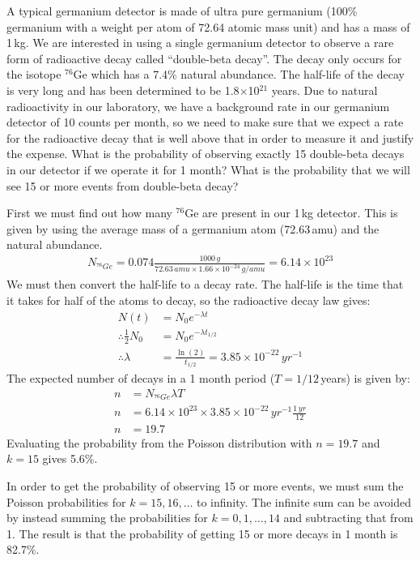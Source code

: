 \begin{example}{}{A typical germanium detector is made of ultra pure germanium (100\% germanium with a weight per atom of 72.64 atomic mass unit) and has a mass of 1\,kg. We are interested in using a single germanium detector to observe a rare form of radioactive decay called ``double-beta decay''. The decay only occurs for the isotope $^{76}$Ge which has a 7.4\% natural abundance. The half-life of the decay is very long and has been determined to be 1.8$\times$10$^{21}$ years. Due to natural radioactivity in our laboratory, we have a background rate in our germanium detector of 10 counts per month, so we need to make sure that we expect a rate for the radioactive decay that is well above that in order to measure it and justify the expense. What is the probability of observing exactly 15 double-beta decays in our detector if we operate it for 1 month? What is the probability that we will see 15 or more events from double-beta decay?}{}

First we must find out how many $^{76}$Ge are present in our 1\,kg detector. This is given by using the average mass of a germanium atom (72.63\,amu) and the natural abundance. 
\begin{align*}
N_{^{76}Ge}=0.074\frac{1000\,g}{72.63\,amu\times1.66\times10^{-24}\,g/amu}=6.14\times10^{23}
\end{align*}
We must then convert the half-life to a decay rate. The half-life is the time that it takes for half of the atoms to decay, so the radioactive decay law gives:
\begin{align*}
N(t)&=N_0e^{-\lambda t}\\
\therefore \frac{1}{2}N_0&=N_0e^{-\lambda t_{1/2}}\\
\therefore \lambda&=\frac{\ln(2)}{t_{1/2}}=3.85\times 10^{-22}\,yr^{-1}
\end{align*}
The expected number of decays in a 1 month period ($T=1/12$\,years) is given by:
\begin{align*}
n&=N_{^{76}Ge}\lambda T\\
n&=6.14\times10^{23}\times3.85\times 10^{-22}\,yr^{-1}\frac{1\,yr}{12}\\
n&=19.7
\end{align*}
Evaluating the probability from the Poisson distribution with $n=19.7$ and $k=15$ gives 5.6\%.

In order to get the probability of observing 15 or more events, we must sum the Poisson probabilities for $k=15,16,\dots$ to infinity. The infinite sum can be avoided by instead summing the probabilities for $k=0,1,\dots,14$ and subtracting that from 1. The result is that the probability of getting 15 or more decays in 1 month is 82.7\%.


\end{example}

